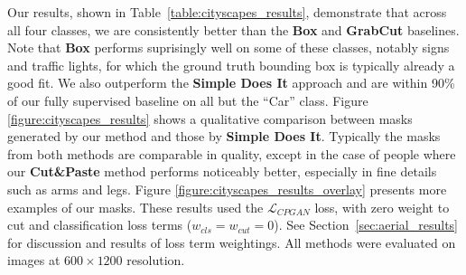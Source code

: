 \documentclass[runningheads]{llncs}
\begin{document}

Our results, shown in Table~\ref{table:cityscapes_results}, demonstrate that
across all four classes, we are consistently better than the {\bf Box}
and  {\bf GrabCut} baselines. Note that {\bf Box} performs suprisingly well on some of these classes, notably signs and traffic lights, for which the ground truth bounding box is typically already a good fit. We also outperform the {\bf Simple Does It} approach and are within 90\% of our fully supervised baseline on all but the ``Car'' class.
Figure \ref{figure:cityscapes_results} shows a qualitative comparison between
masks generated by our method and those by {\bf Simple Does It}. Typically the masks from both methods are comparable in quality, except in the case of people where our {\bf Cut\&Paste} method performs noticeably better, especially in fine details such as arms and legs. 
Figure \ref{figure:cityscapes_results_overlay} presents more examples of our masks.
These results used the $\mathcal{L}_{CPGAN}$ loss, with zero weight to cut and classification loss terms ($w_{cls}=w_{cut}=0$). See Section~\ref{sec:aerial_results} for discussion and results of loss term weightings. All methods were evaluated on images at $600\times 1200$ resolution.
\end{document}
